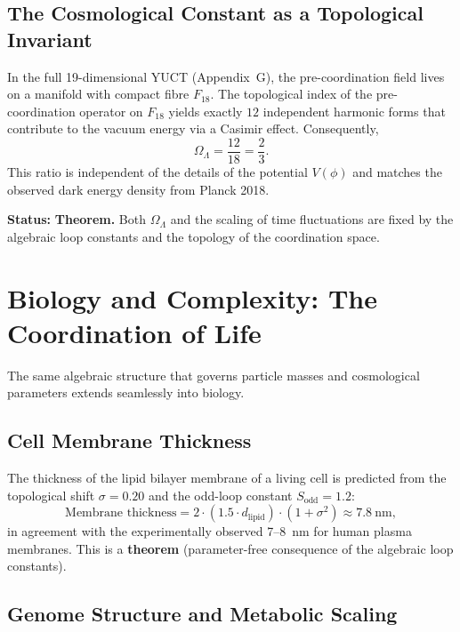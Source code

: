 \documentclass[12pt,a4paper]{article}
\begin{document}
	\subsection{The Cosmological Constant as a Topological Invariant}
	
	In the full 19-dimensional YUCT (Appendix~G), the pre-coordination field lives on a manifold with compact fibre \(F_{18}\). The topological index of the pre-coordination operator on \(F_{18}\) yields exactly \(12\) independent harmonic forms that contribute to the vacuum energy via a Casimir effect. Consequently,
	\begin{equation}
		\boxed{\Omega_\Lambda = \frac{12}{18} = \frac{2}{3}}.
		\label{eq:OmegaLambda}
	\end{equation}
	This ratio is independent of the details of the potential \(V(\phi)\) and matches the observed dark energy density from Planck 2018.
	
	\textbf{Status:} \textbf{Theorem.} Both \(\Omega_\Lambda\) and the scaling of time fluctuations are fixed by the algebraic loop constants and the topology of the coordination space.
	
	\section{Biology and Complexity: The Coordination of Life}
	\label{sec:biology}
	
	The same algebraic structure that governs particle masses and cosmological parameters extends seamlessly into biology.
	
	\subsection{Cell Membrane Thickness}
	
	The thickness of the lipid bilayer membrane of a living cell is predicted from the topological shift \(\sigma = 0.20\) and the odd-loop constant \(S_{\mathrm{odd}} = 1.2\):
	\[
	\text{Membrane thickness} = 2 \cdot (1.5 \cdot d_{\mathrm{lipid}}) \cdot (1 + \sigma^2) \approx 7.8\ \mathrm{nm},
	\]
	in agreement with the experimentally observed 7--8~nm for human plasma membranes. This is a \textbf{theorem} (parameter-free consequence of the algebraic loop constants).
	
	\subsection{Genome Structure and Metabolic Scaling}
	
\end{document}
